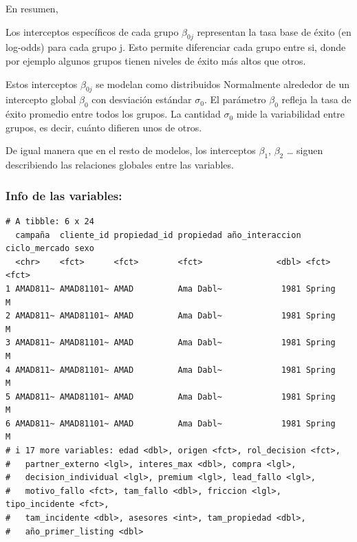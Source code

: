 \documentclass[
  letterpaper,
  DIV=11,
  numbers=noendperiod]{scrartcl}
\begin{document}
En resumen,

Los interceptos específicos de cada grupo \(\beta_{0j}\) representan la
tasa base de éxito (en log-odds) para cada grupo j. Esto permite
diferenciar cada grupo entre si, donde por ejemplo algunos grupos tienen
niveles de éxito más altos que otros.

Estos interceptos \(\beta_{0j}\) se modelan como distribuidos
Normalmente alrededor de un intercepto global \(\beta_{0}\) con
desviación estándar \(\sigma_{0}\). El parámetro \(\beta_{0}\) refleja
la tasa de éxito promedio entre todos los grupos. La cantidad
\(\sigma_{0}\) mide la variabilidad entre grupos, es decir, cuánto
difieren unos de otros.

De igual manera que en el resto de modelos, los interceptos \(\beta_1\),
\(\beta_2\) \ldots{} siguen describiendo las relaciones globales entre
las variables.

\subsubsection{Info de las variables:}\label{info-de-las-variables}

\begin{verbatim}
# A tibble: 6 x 24
  campaña  cliente_id propiedad_id propiedad año_interaccion ciclo_mercado sexo 
  <chr>    <fct>      <fct>        <fct>               <dbl> <fct>         <fct>
1 AMAD811~ AMAD81101~ AMAD         Ama Dabl~            1981 Spring        M    
2 AMAD811~ AMAD81101~ AMAD         Ama Dabl~            1981 Spring        M    
3 AMAD811~ AMAD81101~ AMAD         Ama Dabl~            1981 Spring        M    
4 AMAD811~ AMAD81101~ AMAD         Ama Dabl~            1981 Spring        M    
5 AMAD811~ AMAD81101~ AMAD         Ama Dabl~            1981 Spring        M    
6 AMAD811~ AMAD81101~ AMAD         Ama Dabl~            1981 Spring        M    
# i 17 more variables: edad <dbl>, origen <fct>, rol_decision <fct>,
#   partner_externo <lgl>, interes_max <dbl>, compra <lgl>,
#   decision_individual <lgl>, premium <lgl>, lead_fallo <lgl>,
#   motivo_fallo <fct>, tam_fallo <dbl>, friccion <lgl>, tipo_incidente <fct>,
#   tam_incidente <dbl>, asesores <int>, tam_propiedad <dbl>,
#   año_primer_listing <dbl>
\end{verbatim}

\begingroup\fontsize{8}{10}\selectfont
\end{document}
